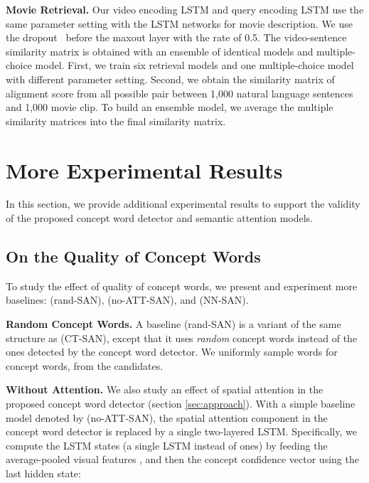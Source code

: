 \documentclass[10pt,twocolumn,letterpaper]{article}
\theoremstyle{nonumberplain}
\begin{document}
\textbf{Movie Retrieval.}
Our video encoding LSTM and query encoding LSTM use the same parameter setting with the LSTM networks for movie description.
We use the dropout~\cite{srivastava-jmlr-2014} before the maxout layer with the rate of 0.5.
The video-sentence similarity matrix  is obtained with an ensemble of identical models and multiple-choice model.
First, we train six retrieval models and one multiple-choice model with different parameter setting.
Second, we obtain the similarity matrix of alignment score from all possible pair between 1,000 natural language sentences and 1,000 movie clip.
To build an ensemble model, we average the multiple similarity matrices into the final similarity matrix.










\section{More Experimental Results}
\label{sec:supp_more_exps}

In this section, we provide additional experimental results to support the validity of
the proposed concept word detector and semantic attention models.


\subsection{On the Quality of Concept Words}

To study the effect of quality of concept words,
we present and experiment more baselines: (rand-SAN), (no-ATT-SAN), and (NN-SAN).

\smallskip
\textbf{Random Concept Words.}
A baseline (rand-SAN) is a variant of the same structure as (CT-SAN),
except that it uses \emph{random} concept words
instead of the ones detected by the concept word detector.
We uniformly sample  words for concept words,
from the  candidates.


\smallskip
\textbf{Without Attention.}
We also study an effect of spatial attention in the proposed concept word detector (section \ref{sec:approach}).
With a simple baseline model denoted by {(no-ATT-SAN)},
the spatial attention component in the concept word detector
is replaced by a single two-layered LSTM.
Specifically, we compute the LSTM states 
(a single LSTM instead of  ones)
by feeding the average-pooled visual features ,
and then the concept confidence vector  using the last hidden state:
\end{document}
